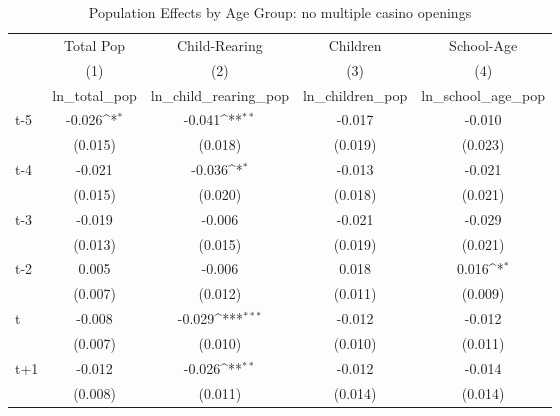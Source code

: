 \begin{table}[htbp]\centering
\def\sym#1{\ifmmode^{#1}\else\(^{#1}\)\fi}
\caption{Population Effects by Age Group: no multiple casino openings}
\begin{tabular}{l*{4}{c}}
\hline\hline
            &\multicolumn{1}{c}{Total Pop}&\multicolumn{1}{c}{Child-Rearing}&\multicolumn{1}{c}{Children}&\multicolumn{1}{c}{School-Age}\\\cmidrule(lr){2-2}\cmidrule(lr){3-3}\cmidrule(lr){4-4}\cmidrule(lr){5-5}
            &\multicolumn{1}{c}{(1)}&\multicolumn{1}{c}{(2)}&\multicolumn{1}{c}{(3)}&\multicolumn{1}{c}{(4)}\\
            &\multicolumn{1}{c}{ln\_total\_pop}&\multicolumn{1}{c}{ln\_child\_rearing\_pop}&\multicolumn{1}{c}{ln\_children\_pop}&\multicolumn{1}{c}{ln\_school\_age\_pop}\\
\hline
t-5         &      -0.026\sym{*}  &      -0.041\sym{**} &      -0.017         &      -0.010         \\
            &     (0.015)         &     (0.018)         &     (0.019)         &     (0.023)         \\
[1em]
t-4         &      -0.021         &      -0.036\sym{*}  &      -0.013         &      -0.021         \\
            &     (0.015)         &     (0.020)         &     (0.018)         &     (0.021)         \\
[1em]
t-3         &      -0.019         &      -0.006         &      -0.021         &      -0.029         \\
            &     (0.013)         &     (0.015)         &     (0.019)         &     (0.021)         \\
[1em]
t-2         &       0.005         &      -0.006         &       0.018         &       0.016\sym{*}  \\
            &     (0.007)         &     (0.012)         &     (0.011)         &     (0.009)         \\
[1em]
t           &      -0.008         &      -0.029\sym{***}&      -0.012         &      -0.012         \\
            &     (0.007)         &     (0.010)         &     (0.010)         &     (0.011)         \\
[1em]
t+1         &      -0.012         &      -0.026\sym{**} &      -0.012         &      -0.014         \\
            &     (0.008)         &     (0.011)         &     (0.014)         &     (0.014)         \\

\end{tabular}
\end{table}
